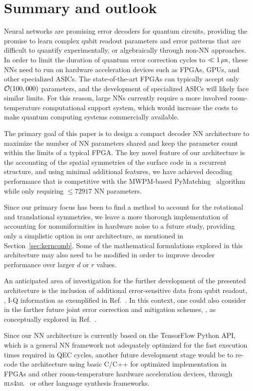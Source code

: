 \section{Summary and outlook}

Neural networks are promising error decoders for quantum circuits, providing the promise to learn complex qubit readout parameters and error patterns that are difficult to quantify experimentally, or algebraically through non-NN approaches.
In order to limit the duration of quantum error correction cycles to $\ll 1\,\mu\text{s}$, these NNs need to run on hardware acceleration devices such as FPGAs, GPUs, and other specialized ASICs. The state-of-the-art FPGAs can typically accept only $\mathcal{O}(100,000)$ parameters, and the development of specialized ASICs will likely face similar limits. For this reason, large NNs currently require a more involved room-temperature computational support system, which would increase the costs to make quantum computing systems commercially available.

The primary goal of this paper is to design a compact decoder NN architecture to maximize the number of NN parameters shared and keep the parameter count within the limits of a typical FPGA. The key novel feature of our architecture is the accounting of the spatial symmetries of the surface code in a recurrent structure, and using minimal additional features, we have achieved decoding performance that is competitive with the MWPM-based PyMatching~\cite{Higgott:2023} algorithm while only requiring $\leq72917$ NN parameters.

Since our primary focus has been to find a method to account for the rotational and translational symmetries, we leave a more thorough implementation of accounting for nonuniformities in hardware noise to a future study, providing only a simplistic option in our architecture, as mentioned in Section~\ref{sec:kerncomb}. Some of the mathematical formulations explored in this architecture may also need to be modified in order to improve decoder performance over larger $d$ or $r$ values.

An anticipated area of investigation for the further development of the presented architecture is the inclusion of additional error-sensitive data from qubit readout, \eg, I-Q information as exemplified in Ref.~\cite{Bausch:2023jgi}. In this context, one could also consider in the farther future joint error correction and mitigation schemes, \eg, as conceptually explored in Ref.~\cite{Sarica:2023}.

Since our NN architecture is currently based on the TensorFlow Python API, which is a general NN framework not adequately optimized for the fast execution times required in QEC cycles, another future development stage would be to re-code the architecture using basic C/C++ for optimized implementation in FPGAs and other room-temperature hardware acceleration devices, through \textsc{hls4ml}~\cite{hls4ml} or other language synthesis frameworks.
